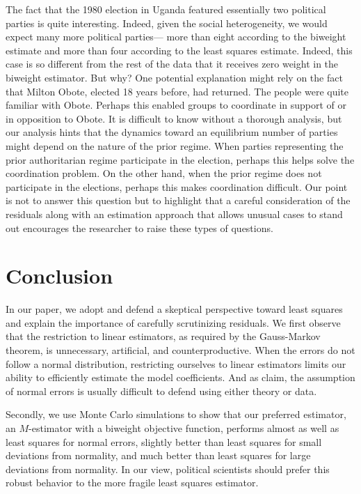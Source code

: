 \documentclass[12pt]{article}
\begin{document}
The fact that the 1980 election in Uganda featured essentially two political parties is quite interesting. 
Indeed, given the social heterogeneity, we would expect many more political parties--- more than eight according to the biweight estimate and more than four according to the least squares estimate. 
Indeed, this case is so different from the rest of the data that it receives zero weight in the biweight estimator. 
But why? 
One potential explanation might rely on the fact that Milton Obote, elected 18 years before, had returned. 
The people were quite familiar with Obote. 
Perhaps this enabled groups to coordinate in support of or in opposition to Obote. 
It is difficult to know without a thorough analysis, but our analysis hints that the dynamics toward an equilibrium number of parties might depend on the nature of the prior regime. 
When parties representing the prior authoritarian regime participate in the election, perhaps this helps solve the coordination problem. 
On the other hand, when the prior regime does not participate in the elections, perhaps this makes coordination difficult. 
Our point is not to answer this question but to highlight that a careful consideration of the residuals along with an estimation approach that allows unusual cases to stand out encourages the researcher to raise these types of questions.

\section*{Conclusion}

In our paper, we adopt and defend a skeptical perspective toward least squares and explain the importance of carefully scrutinizing residuals.
We first observe that the restriction to linear estimators, as required by the Gauss-Markov theorem, is unnecessary, artificial, and counterproductive. 
When the errors do not follow a normal distribution, restricting ourselves to linear estimators limits our ability to efficiently estimate the model coefficients. And as \cite{BerryFeldman1985} claim, the assumption of normal errors is usually difficult to defend using either theory or data. 

Secondly, we use Monte Carlo simulations to show that our preferred estimator, an $M$-estimator with a biweight objective function, performs almost as well as least squares for normal errors, slightly better than least squares for small deviations from normality, and much better than least squares for large deviations from normality. 
In our view, political scientists should prefer this robust behavior to the more fragile least squares estimator.
\end{document}
